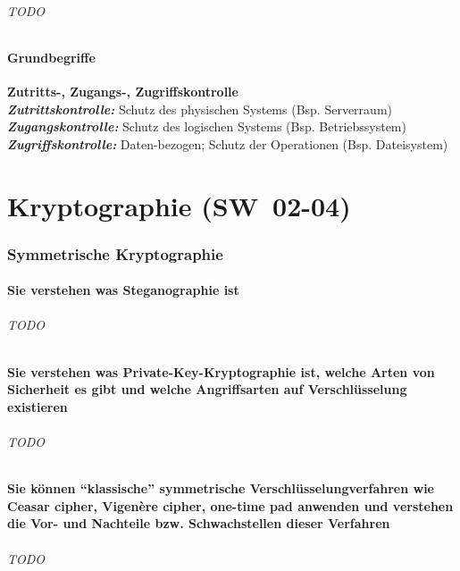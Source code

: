 \documentclass[10pt,a4paper]{article}
\begin{document}
\paragraph*{TODO}
\subsection*{Grundbegriffe}
\textbf{Zutritts-, Zugangs-, Zugriffskontrolle}\\
\textbf{\textsl{Zutrittskontrolle: }}Schutz des physischen Systems (Bsp. Serverraum)\\
\textbf{\textsl{Zugangskontrolle: }}Schutz des logischen Systems (Bsp. Betriebssystem)\\
\textbf{\textsl{Zugriffskontrolle: }}Daten-bezogen; Schutz der Operationen (Bsp. Dateisystem)

\part{Kryptographie (SW~02-04)}
\section{Symmetrische Kryptographie}
\subsection*{Sie verstehen was Steganographie ist}
\paragraph*{TODO}
\subsection*{Sie verstehen was Private-Key-Kryptographie ist, welche Arten von Sicherheit es gibt und welche Angriffsarten auf Verschlüsselung existieren}
\paragraph*{TODO}
\subsection*{Sie können "`klassische"' symmetrische Verschlüsselungverfahren wie Ceasar cipher, Vigenère cipher, one-time pad anwenden und verstehen die Vor- und Nachteile bzw. Schwachstellen dieser Verfahren}
\paragraph*{TODO}
\end{document}
